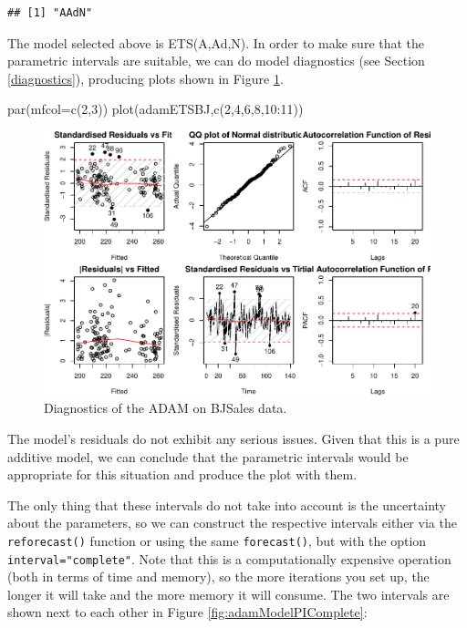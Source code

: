 \documentclass[
]{book}
\newenvironment{Shaded}{\begin{snugshade}}{\end{snugshade}}
\newcommand{\AttributeTok}[1]{\textcolor[rgb]{0.77,0.63,0.00}{#1}}
\newcommand{\DecValTok}[1]{\textcolor[rgb]{0.00,0.00,0.81}{#1}}
\newcommand{\FunctionTok}[1]{\textcolor[rgb]{0.00,0.00,0.00}{#1}}
\newcommand{\NormalTok}[1]{#1}
\newcommand{\SpecialCharTok}[1]{\textcolor[rgb]{0.00,0.00,0.00}{#1}}
\theoremstyle{definition}
\theoremstyle{definition}
\theoremstyle{definition}
\theoremstyle{definition}
\theoremstyle{remark}
\begin{document}
\begin{verbatim}
## [1] "AAdN"
\end{verbatim}

The model selected above is ETS(A,Ad,N). In order to make sure that the parametric intervals are suitable, we can do model diagnostics (see Section \ref{diagnostics}), producing plots shown in Figure \ref{fig:adamModelDiagnostics}.

\begin{Shaded}
\begin{Highlighting}[]
\FunctionTok{par}\NormalTok{(}\AttributeTok{mfcol=}\FunctionTok{c}\NormalTok{(}\DecValTok{2}\NormalTok{,}\DecValTok{3}\NormalTok{))}
\FunctionTok{plot}\NormalTok{(adamETSBJ,}\FunctionTok{c}\NormalTok{(}\DecValTok{2}\NormalTok{,}\DecValTok{4}\NormalTok{,}\DecValTok{6}\NormalTok{,}\DecValTok{8}\NormalTok{,}\DecValTok{10}\SpecialCharTok{:}\DecValTok{11}\NormalTok{))}
\end{Highlighting}
\end{Shaded}

\begin{figure}
\centering
\includegraphics{Svetunkov--2022----ADAM_files/figure-latex/adamModelDiagnostics-1.pdf}
\caption{\label{fig:adamModelDiagnostics}Diagnostics of the ADAM on BJSales data.}
\end{figure}

The model's residuals do not exhibit any serious issues. Given that this is a pure additive model, we can conclude that the parametric intervals would be appropriate for this situation and produce the plot with them.

The only thing that these intervals do not take into account is the uncertainty about the parameters, so we can construct the respective intervals either via the \texttt{reforecast()} function or using the same \texttt{forecast()}, but with the option \texttt{interval="complete"}. Note that this is a computationally expensive operation (both in terms of time and memory), so the more iterations you set up, the longer it will take and the more memory it will consume. The two intervals are shown next to each other in Figure \ref{fig:adamModelPIComplete}:
\end{document}
